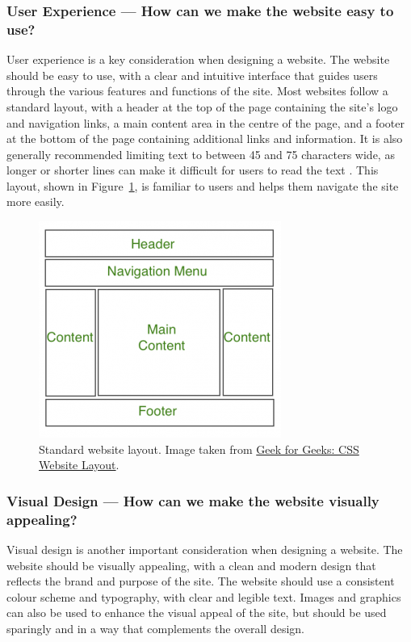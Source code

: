 \documentclass[../main.tex]{subfiles}
\begin{document}
            \subsubsection{User Experience — How can we make the website easy to use?}
                User experience is a key consideration when designing a website.
                The website should be easy to use, with a clear and intuitive interface that
                    guides users through the various features and functions of the site.
                Most websites follow a standard layout, with a header at the top of the page
                    containing the site's logo and navigation links, a main content area in the
                    centre of the page, and a footer at the bottom of the page containing
                    additional links and information.
                It is also generally recommended limiting text to between 45 and 75 characters
                    wide, as longer or shorter lines can make it difficult for users to read the
                    text \citep{lineLength}.
                This layout, shown in Figure~\ref{fig:webLayout}, is familiar to users and
                    helps them navigate the site more easily.

                \begin{figure}[H]
                    \centering
                    \includegraphics[width=0.45\linewidth]{images/webLayout.png}
                        \caption{Standard website layout.
                            Image taken from \href{https://www.geeksforgeeks.org/css-website-layout/}{Geek
                                    for Geeks: CSS Website Layout}.
                        }
                        \label{fig:webLayout}
                \end{figure}

            \subsubsection{Visual Design — How can we make the website visually appealing?}
                Visual design is another important consideration when designing a website.
                The website should be visually appealing, with a clean and modern design that
                    reflects the brand and purpose of the site.
                The website should use a consistent colour scheme and typography, with clear
                    and legible text.
                Images and graphics can also be used to enhance the visual appeal of the site,
                    but should be used sparingly and in a way that complements the overall design.
\end{document}
